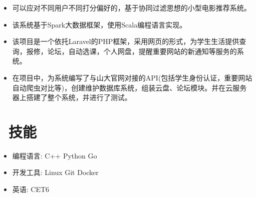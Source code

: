 \documentclass{resume}
\begin{document}
  \begin{itemize}[topsep = 0 pt, partopsep = 0pt]
    \item 可以应对不同用户不同打分偏好的，基于协同过滤思想的小型电影推荐系统。
    \item 该系统基于Spark大数据框架，使用Scala编程语言实现。
  \end{itemize}

  \begin{itemize}[topsep = 0 pt, partopsep = 0pt]
    \item 该项目是一个依托Laravel的PHP框架，采用网页的形式，为学生生活提供查询，报修，论坛，自动选课，个人网盘，提醒重要网站的新通知等服务的系统。
    \item 在项目中，为系统编写了与山大官网对接的API(包括学生身份认证，重要网站自动爬虫对比等)，创建维护数据库系统，组装云盘、论坛模块。并在云服务器上搭建了整个系统，并进行了测试。
  \end{itemize}
  
  
  \section{\faCogs\ 技能}
  \begin{itemize}[parsep=0.5ex]
    \item 编程语言: C++ Python Go
    \item 开发工具: Linux Git Docker
    \item 英语: CET6
  \end{itemize}
  
  
\end{document}

